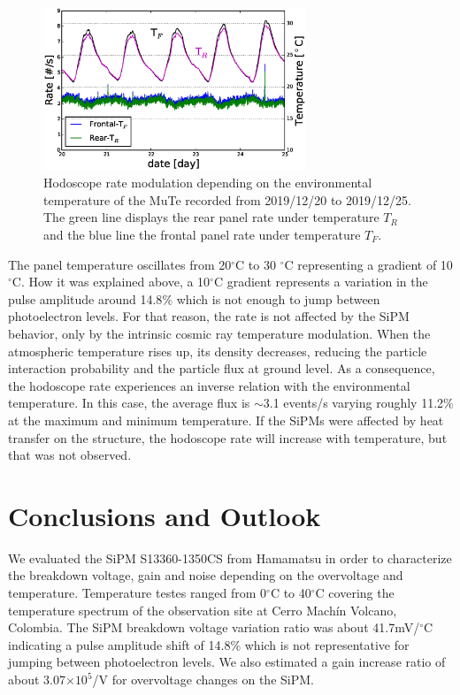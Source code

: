 \documentclass[a4paper,11pt]{article}
\begin{document}
\begin{figure}[htbp]
\centering 
\includegraphics[width=0.7\textwidth]{Figures/Modulation.eps}
\caption{\label{fig:temp} Hodoscope rate modulation depending on the environmental temperature of the MuTe recorded from 2019/12/20 to 2019/12/25. The green line displays the rear panel rate under temperature $T_R$ and the blue line the frontal panel rate under temperature $T_F$. }
\end{figure}

The panel temperature oscillates from 20$^{\circ}$C to 30 $^{\circ}$C representing a gradient of 10$^{\circ}$C. How it was explained above, a 10$^{\circ}$C gradient represents a variation in the pulse amplitude around 14.8$\%$ which is not enough to jump between photoelectron levels. For that reason, the rate is not affected by the SiPM behavior, only by the intrinsic cosmic ray temperature modulation. When the atmospheric temperature rises up, its density decreases, reducing the particle interaction probability and the particle flux at ground level. As a consequence, the hodoscope rate experiences an inverse relation with the environmental temperature. In this case, the average flux is $\sim$3.1 events/s varying roughly 11.2$\%$ at the maximum and minimum temperature. If the SiPMs were affected by heat transfer on the structure, the hodoscope rate will increase with temperature, but that was not observed.

\section{Conclusions and Outlook}
\label{sec:conc}

We evaluated the SiPM S13360-1350CS from Hamamatsu in order to characterize the breakdown voltage, gain and noise depending on the overvoltage and temperature. Temperature testes ranged from 0$^{\circ}$C to 40$^{\circ}$C covering the temperature spectrum of the observation site at Cerro Mach\'in Volcano, Colombia. The SiPM breakdown voltage variation ratio was about 41.7mV/$^{\circ}$C indicating a pulse amplitude shift of 14.8$\%$ which is not representative for jumping between photoelectron levels. We also estimated a gain increase ratio of about 3.07$\times 10^5$/V for overvoltage changes on the SiPM. 
\end{document}
